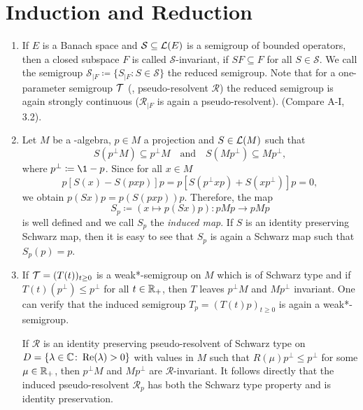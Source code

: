 \section{Induction and Reduction}
\begin{enumerate}[1., wide, labelindent=.5em]
\item
If $ E $ is a Banach space and $ \mathcal{S} \subseteq \mathcal{L}(E) $ is a semigroup of bounded operators, then a closed subspace $ F $ is called $ \mathcal{S} $-invariant, if $ SF \subseteq F $ for all $ S \in \mathcal{S} $.
We call the semigroup $ \mathcal{S}_{\vert F} \coloneqq \{S_{\vert F} \colon S \in \mathcal{S} \} $ the reduced semigroup.
Note that for a one-parameter semigroup $ \mathcal{T} $ (\resp, pseudo-resolvent $ \mathcal{R} $) the reduced semigroup is again strongly continuous (\resp $ \mathcal{R}_{\vert F} $ is again a pseudo-resolvent). (Compare A-I, 3.2).

\item
Let $ M $ be a \WA-algebra, $ p \in M $ a projection and $ S \in \mathcal{L}(M) $ such that 
%
\[
	S( p^{\perp}M ) \subseteq p^{\perp}M 
	\quad \text{and} \quad 
	S( Mp^{\perp} ) \subseteq Mp^{\perp} ,  
\]
%
where $ p^{\perp} \coloneqq \1-p $.
Since for all $ x \in M $
\[
p[S(x) - S(pxp)]p = p[S(p^{\perp}xp) + S(xp^{\perp})]p = 0,
\]
we obtain $ p(Sx)p = p(S(pxp))p $.
Therefore, the map
\[
S_{p} \coloneqq (x \mapsto p(Sx)p) \colon pMp \to pMp
\]
is well defined and we call $ S_{p} $ the \emph{induced map}.
If $ S $ is an identity preserving Schwarz map, then it is easy to see that $ S_{p} $ is again a Schwarz map such that $ S_{p}(p) = p $.

\item
If $ \mathcal{T} = (T(t))_{t\geq0} $ is a weak*-semigroup on $ M $ which is of Schwarz type and if $ T(t)(p^{\perp}) \leq p^{\perp} $ for all $ t \in \mathbb{R}_{+} $, then $ T $ leaves $ p^{\perp}M $ and $ Mp^{\perp} $ invariant.
One can verify that the induced semigroup $T_p = (T(t)p)_{t \geq 0}$ is again a weak*-semigroup.

If  $ \mathcal{R} $ is an identity preserving pseudo-resolvent of Schwarz type on $ D = \{\lambda \in \mathbb{C} \colon \mathop{}\!\mathrm{Re}(\lambda) > 0\} $ with values in $ M $ such that $ R(\mu)p^{\perp} \leq p^{\perp} $ for some $ \mu \in \mathbb{R}_{+} $, then $ p^{\perp}M $ and $ Mp^{\perp} $ are  $ \mathcal{R} $-invariant.
It follows directly that the induced pseudo-resolvent $ \mathcal{R}_p$ has both the Schwarz type property and is identity preservation.


\end{enumerate}

